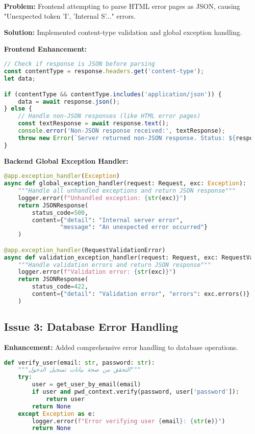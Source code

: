 \documentclass[12pt,a4paper]{article}
\begin{document}
\textbf{Problem:} Frontend attempting to parse HTML error pages as JSON, causing "Unexpected token 'I', 'Internal S'..." errors.

\textbf{Solution:} Implemented content-type validation and global exception handling.

\textbf{Frontend Enhancement:}
\begin{lstlisting}[language=JavaScript, caption=Enhanced Login Error Handling]
// Check if response is JSON before parsing
const contentType = response.headers.get('content-type');
let data;

if (contentType && contentType.includes('application/json')) {
    data = await response.json();
} else {
    // Handle non-JSON responses (like HTML error pages)
    const textResponse = await response.text();
    console.error('Non-JSON response received:', textResponse);
    throw new Error(`Server returned non-JSON response. Status: ${response.status}`);
}
\end{lstlisting}

\textbf{Backend Global Exception Handler:}
\begin{lstlisting}[language=Python, caption=FastAPI Global Exception Handler]
@app.exception_handler(Exception)
async def global_exception_handler(request: Request, exc: Exception):
    """Handle all unhandled exceptions and return JSON response"""
    logger.error(f"Unhandled exception: {str(exc)}")
    return JSONResponse(
        status_code=500,
        content={"detail": "Internal server error", 
                "message": "An unexpected error occurred"}
    )

@app.exception_handler(RequestValidationError)
async def validation_exception_handler(request: Request, exc: RequestValidationError):
    """Handle validation errors and return JSON response"""
    logger.error(f"Validation error: {str(exc)}")
    return JSONResponse(
        status_code=422,
        content={"detail": "Validation error", "errors": exc.errors()}
    )
\end{lstlisting}

\subsection{Issue 3: Database Error Handling}

\textbf{Enhancement:} Added comprehensive error handling to database operations.

\begin{lstlisting}[language=Python, caption=Enhanced Database Error Handling]
def verify_user(email: str, password: str):
    """التحقق من صحة بيانات تسجيل الدخول"""
    try:
        user = get_user_by_email(email)
        if user and pwd_context.verify(password, user['password']):
            return user
        return None
    except Exception as e:
        logger.error(f"Error verifying user {email}: {str(e)}")
        return None
\end{lstlisting}
\end{document}
